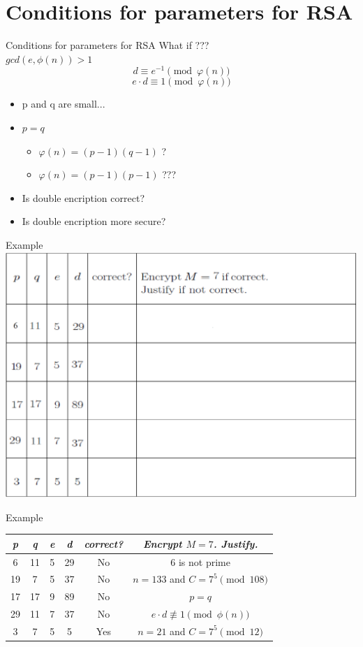 \documentclass{beamer}
\begin{document}
\section{Conditions for parameters for RSA}

\begin{frame}{Conditions for parameters for RSA}
    What if ??? \\
    $gcd(e, \phi(n)) > 1$ 
    $$d \equiv e^{-1} \pmod{ \varphi(n)}$$
    $$e \cdot d \equiv 1 \pmod{\varphi(n)}$$
    \begin{itemize}
        \item p and q are small...
        \item $p = q$
        \begin{itemize}
            \item $\varphi(n) = (p-1)(q-1)$ ?
            \item $\varphi(n) = (p-1)(p-1)$ ???
        \end{itemize}
        \item Is double encription correct?
        \item Is double encription more secure?
    \end{itemize}
\end{frame}

\begin{frame}{Example}
    \centering
    \includegraphics[width=.7\linewidth]{1.png}
\end{frame}

\begin{frame}{Example}
    \centering
    \begin{tabular}{|c|c|c|c|c|c|}
        \hline
         \textit{p}  & \textit{q}  & \textit{e}  & \textit{d}  & \textit{correct?} & \textit{Encrypt $M = 7$. Justify.}  \\ \hline
         6  & 11 & 5  & 29 & No       & 6 is not prime  \\ \hline
         19 & 7  & 5  & 37 & No       & $n = 133$ and $C = 7^5 \pmod{108} $  \\ \hline
         17 & 17 & 9  & 89 & No       & $p = q$  \\ \hline
         29 & 11 & 7  & 37 & No       & $e \cdot d \not\equiv 1 \pmod{\phi(n)} $  \\ \hline
         3  & 7  & 5  & 5  & Yes      & $n = 21$ and $C = 7^5 \pmod{12}$  \\ \hline
    \end{tabular}
\end{frame}
\end{document}
